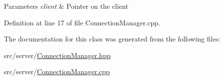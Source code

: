 \begin{DoxyParams}{Parameters}
{\em client} & Pointer on the client \\
\hline
\end{DoxyParams}


Definition at line 17 of file Connection\+Manager.\+cpp.



The documentation for this class was generated from the following files\+:\begin{DoxyCompactItemize}
\item 
src/server/\hyperlink{_connection_manager_8hpp}{Connection\+Manager.\+hpp}\item 
src/server/\hyperlink{_connection_manager_8cpp}{Connection\+Manager.\+cpp}\end{DoxyCompactItemize}
